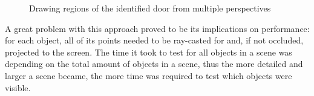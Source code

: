 \begin{figure}[htp]
{    }\quad
    \quad
    \caption{Drawing regions of the identified door from multiple perspectives}
    \label{fig:w2s-labelling}
\end{figure}
A great problem with this approach proved to be its implications on performance: for each object, all of its points needed to be ray-casted for and, if not occluded, projected to the screen. The time it took to test for all objects in a scene was depending on the total amount of objects in a scene, thus the more detailed and larger a scene became, the more time was required to test which objects were visible.\\
